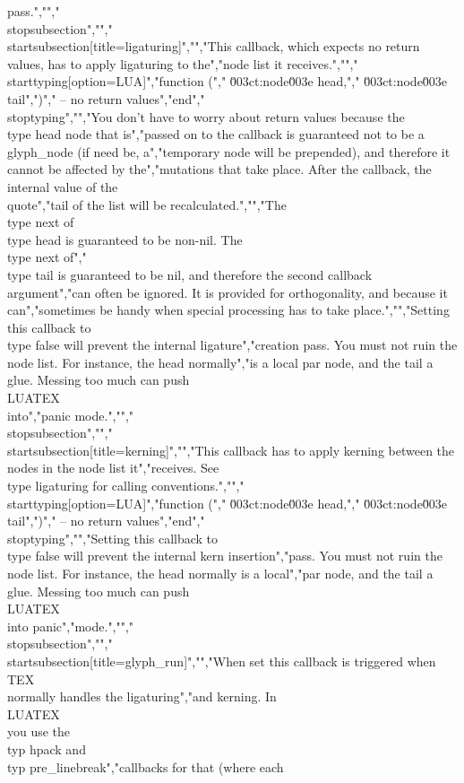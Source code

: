 pass.","","\\stopsubsection","","\\startsubsection[title=ligaturing]","","This callback, which expects no return values, has to apply ligaturing to the","node list it receives.","","\\starttyping[option=LUA]","function (","    \u003ct:node\u003e head,","    \u003ct:node\u003e tail",")","    -- no return values","end","\\stoptyping","","You don't have to worry about return values because the \\type {head} node that is","passed on to the callback is guaranteed not to be a glyph_node (if need be, a","temporary node will be prepended), and therefore it cannot be affected by the","mutations that take place. After the callback, the internal value of the \\quote","{tail of the list} will be recalculated.","","The \\type {next} of \\type {head} is guaranteed to be non-nil. The \\type {next} of","\\type {tail} is guaranteed to be nil, and therefore the second callback argument","can often be ignored. It is provided for orthogonality, and because it can","sometimes be handy when special processing has to take place.","","Setting this callback to \\type {false} will prevent the internal ligature","creation pass. You must not ruin the node list. For instance, the head normally","is a local par node, and the tail a glue. Messing too much can push \\LUATEX\\ into","panic mode.","","\\stopsubsection","","\\startsubsection[title=kerning]","","This callback has to apply kerning between the nodes in the node list it","receives. See \\type {ligaturing} for calling conventions.","","\\starttyping[option=LUA]","function (","    \u003ct:node\u003e head,","    \u003ct:node\u003e tail",")","    -- no return values","end","\\stoptyping","","Setting this callback to \\type {false} will prevent the internal kern insertion","pass. You must not ruin the node list. For instance, the head normally is a local","par node, and the tail a glue. Messing too much can push \\LUATEX\\ into panic","mode.","","\\stopsubsection","","\\startsubsection[title=glyph_run]","","When set this callback is triggered when \\TEX\\ normally handles the ligaturing","and kerning. In \\LUATEX\\ you use the \\typ {hpack} and \\typ {pre_linebreak}","callbacks for that (where each 